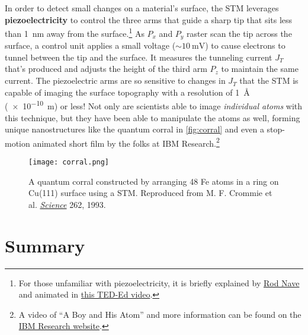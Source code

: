 In order to detect small changes on a material's surface, the STM leverages \textbf{piezoelectricity} to control the three arms that guide a sharp tip that sits less than \SI{1}{\nano\meter} away from the surface.\footnote{For those unfamiliar with piezoelectricity, it is briefly explained by \href{http://hyperphysics.phy-astr.gsu.edu/hbase/Solids/piezo.html}{Rod Nave} and animated in \href{https://www.youtube.com/watch?v=YEJ2qryXcIQ}{this TED-Ed video}.} 
As $P_x$ and $P_y$ raster scan the tip across the surface, a control unit applies a small voltage ($\sim\SI{10}{\milli\volt}$) to cause electrons to tunnel between the tip and the surface. 
It measures the tunneling current $J_T$ that's produced and adjusts the height of the third arm $P_z$ to maintain the same current. 
The piezoelectric arms are so sensitive to changes in $J_T$ that the STM is capable of imaging the surface topography with a resolution of \SI{1}{\angstrom} (\SI{e-10}{\meter}) or less! 
Not only are scientists able to image \emph{individual atoms} with this technique, but they have been able to manipulate the atoms as well, forming unique nanostructures like the quantum corral in \autoref{fig:corral} and even a stop-motion animated short film by the folks at IBM Research.\footnote{A video of ``A Boy and His Atom'' and more information can be found on the \href{http://www.research.ibm.com/articles/madewithatoms.shtml\#fbid=9xTkVKSpT3k}{IBM Research website}.}

\begin{figure}[!h]
	\centering
	\texttt{[image: corral.png]}
	\caption{A quantum corral constructed by arranging 48 Fe atoms in a ring on Cu(111) surface using a STM. 
	Reproduced from M. F. Crommie et al. \href{http://science.sciencemag.org/content/262/5131/218}{\emph{Science}} 262, 1993.}
	\label{fig:corral}
\end{figure}


\section{Summary}

